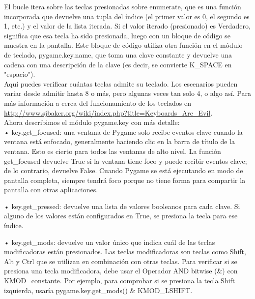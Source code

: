 {El bucle itera sobre las teclas presionadas  sobre {\ttfamily enumerate}, que es una función incorporada que devuelve una tupla del índice (el primer valor es 0, el segundo es 1, etc.) y el valor de la lista iterada. Si el valor iterado (presionado) es Verdadero, significa que esa tecla ha sido presionada, luego con un bloque de código se muestra en la pantalla. Este bloque de código
utiliza otra función en el módulo de teclado,  {\ttfamily pygame.key.name}, que toma una clave constante y devuelve una cadena con una descripción de la clave (es decir, se convierte {\ttfamily K\_SPACE} en "{}espacio"{}).\\

Aquí puedes verificar cuántas teclas admite su teclado. Los  escenarios pueden variar desde admitir hasta 8 o más, pero algunas veces
tan solo 4, o algo así.  Para más información  a cerca del funcionamiento de los teclados en  \href{http://www.sjbaker.org/wiki/index.php?title=Keyboards\_Are\_Evil}{\color{vino} http://www.sjbaker.org/wiki/index.php?title=Keyboards\_Are\_Evil}.\\



Ahora describimos el módulo {\ttfamily pygame.key} con más detalle:\\


•  {\ttfamily key.get\_focused}: una ventana de Pygame solo recibe eventos clave cuando la ventana
está enfocado, generalmente haciendo clic en la barra de título de la ventana. Esto es cierto para todos las ventanas de alto nivel.
La función  {\ttfamily get\_focused} devuelve True si la ventana tiene foco y
puede recibir eventos clave; de lo contrario, devuelve False. Cuando Pygame se está ejecutando en
modo de pantalla completa, siempre tendrá foco porque no tiene forma para  compartir la pantalla con otras aplicaciones.

•  {\ttfamily key.get\_pressed}: devuelve una lista de valores booleanos para cada clave. Si alguno de los valores
están configurados en True, se presiona la tecla para ese índice.

•  {\ttfamily key.get\_mods}: devuelve un valor único que indica cuál de las teclas modificadoras
están presionados. Las teclas modificadoras son teclas como Shift, Alt y Ctrl que se utilizan en
combinación con otras teclas. Para verificar si se presiona una tecla modificadora, debe usar el
Operador  {\ttfamily AND bitwise} (\&) con {\ttfamily KMOD\_constante}. 
Por ejemplo, para comprobar si se presiona la tecla Shift izquierda, usaría  {\ttfamily pygame.key.get\_mods()} \&
 {\ttfamily KMOD\_LSHIFT}.


}
